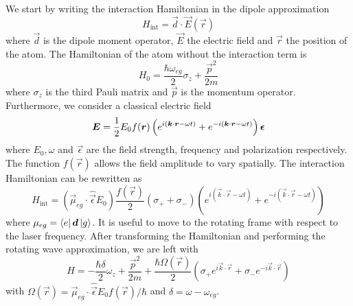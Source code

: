 We start by writing the interaction Hamiltonian in the dipole approximation
\begin{equation}
    H_\text{int} = \vec{d} \cdot \vec{E}(\vec{r})
\end{equation}
where $\vec{d}$ is the dipole moment operator, $\vec{E}$ the electric field and $\vec{r}$ the position of the atom. The Hamiltonian of the atom without the interaction term is
\begin{equation}
    H_0 = \frac{\hbar \omega_{eg}}{2} \sigma_z + \frac{\vec
        {p}^2}{2m}
\end{equation}
where $\sigma_z$ is the third Pauli matrix and $\vec{p}$ is the momentum operator.
Furthermore, we consider a classical electric field
\begin{equation}
    \mathbf{\boldsymbol{E}} = \frac{1}{2} E_0 f(\mathbf{\boldsymbol{r}} ) \left(e^{i( \mathbf{\boldsymbol{k}}\cdot\mathbf{\boldsymbol{r}} - \omega t)} + e^{-i( \mathbf{\boldsymbol{k}}\cdot\mathbf{\boldsymbol{r}} - \omega t)}  \right) \mathbf{\boldsymbol{\epsilon}}
\end{equation}
where $E_0, \omega$ and $\vec{\epsilon}$ are the field strength, frequency and polarization respectively. The function $f(\vec{r})$ allows the field amplitude to vary spatially. The interaction Hamiltonian can be rewritten as
\begin{equation}
    H_\text{int} = (\vec{\mu}_{eg} \cdot \hat{\vec{\epsilon}} E_0) \frac{f(\vec{r})}{2} (\sigma_+ + \sigma_{-}) \left(e^{i( \vec{k}\cdot\vec{r} - \omega t)} + e^{-i( \vec{k}\cdot\vec{r} - \omega t)}  \right)
\end{equation}
where $\mu_{eg} = \bra{e} \mathbf{\boldsymbol{d}} \ket{g}$. It is useful to move to the rotating frame with respect to the laser frequency. After transforming the Hamiltonian and performing the rotating wave approximation, we are left with
\begin{equation}
    H = -\frac{\hbar \delta}{2} \omega_z + \frac{\vec{p}^2}{2m} + \frac{\hbar \Omega(\vec
        r)}{2} \left( \sigma_+ e^{i\vec{k}\cdot \vec{r}} +  \sigma_{-} e^{-i\vec{k}\cdot \vec{r} } \right)
\end{equation}
with $\Omega(\vec{r}) = \vec{\mu}_{eg} \cdot \hat{\vec{\epsilon}} E_0 f(\vec{r}) / \hbar$ and $\delta = \omega - \omega_{eg}$.

